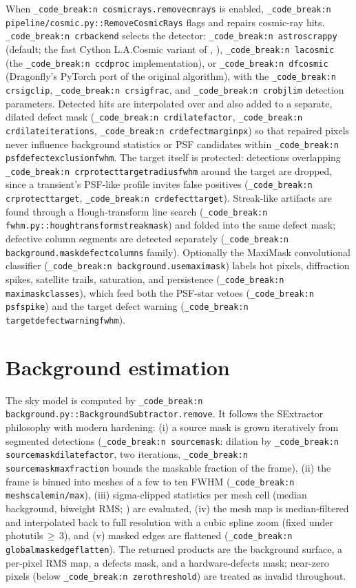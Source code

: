 \documentclass[11pt,a4paper]{article}
\renewcommand{\_}{\autophotunderscore\allowbreak}
\DeclareRobustCommand{\code}[1]{\texttt{\autophot_code_break:n {#1}}}
\begin{document}
When \code{cosmic\_rays.remove\_cmrays} is enabled,
\code{pipeline/cosmic.py::RemoveCosmicRays} flags and repairs cosmic-ray
hits. \code{cr\_backend} selects the detector: \code{astroscrappy}
(default; the fast Cython L.A.Cosmic variant of
\citet{vandokkum2001lacosmic}, \citealp{mccully2018astroscrappy}),
\code{lacosmic} (the \code{ccdproc} implementation), or \code{dfcosmic}
(Dragonfly's PyTorch port of the original algorithm), with the
\code{cr\_sigclip}, \code{cr\_sigfrac}, and \code{cr\_objlim}
detection parameters. Detected hits are interpolated over and also added
to a separate, dilated defect mask
(\code{cr\_dilate\_factor}, \code{cr\_dilate\_iterations},
\code{cr\_defect\_margin\_px}) so that repaired pixels never influence
background statistics or PSF candidates within
\code{psf\_defect\_exclusion\_fwhm}. The target itself is protected:
detections overlapping \code{cr\_protect\_target\_radius\_fwhm} around the
target are dropped, since a transient's PSF-like profile invites false
positives (\code{cr\_protect\_target},
\code{cr\_defect\_target\_*}). Streak-like artifacts are found through a
Hough-transform line search (\code{fwhm.py::hough\_transform\_streak\_mask})
and folded into the same defect mask; defective column segments are
detected separately (\code{background.mask\_defect\_columns} family).
Optionally the MaxiMask convolutional classifier
\citep{paillassa2020maximask}
(\code{background.use\_maximask}) labels hot pixels, diffraction spikes,
satellite trails, saturation, and persistence
(\code{maximask\_classes}), which feed both the PSF-star vetoes
(\code{psf\_spike\_*}) and the target defect warning
(\code{target\_defect\_warning\_fwhm}).

\section{Background estimation}
\label{sec:background}

The sky model is computed by
\code{background.py::BackgroundSubtractor.remove}. It follows the
SExtractor philosophy with modern hardening: (i) a source mask is grown
iteratively from segmented detections (\code{source\_mask\_*}:
dilation by \code{source\_mask\_dilate\_factor}, two iterations,
\code{source\_mask\_max\_fraction} bounds the maskable fraction of the
frame), (ii) the frame is binned into meshes of a few to ten FWHM
(\code{mesh\_scale\_min/max}), (iii) sigma-clipped statistics per mesh
cell (median background, biweight RMS; \citealp{beers1990biweight}) are
evaluated, (iv) the mesh map
is median-filtered and interpolated back to full resolution with a cubic
spline zoom (fixed under photutils\,$\ge$\,3), and (v) masked edges are flattened
(\code{global\_mask\_edge\_flatten}). The returned products are the
background surface, a per-pixel RMS map, a defects mask, and a
hardware-defects mask; near-zero pixels (below \code{zero\_threshold})
are treated as invalid throughout.
\end{document}
